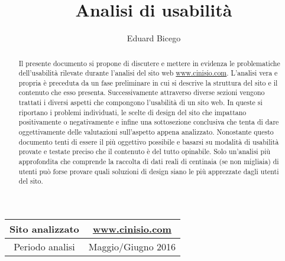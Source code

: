 \documentclass[a4paper,11pt]{article}
\begin{document}
\title{Analisi di usabilità}
\author{Eduard Bicego}
\date{}

\maketitle

%


\begin{table} [h]
		\centering
		\begin{tabular}{c|c}
			Sito analizzato & \href{http://www.cinisio.com/}{www.cinisio.com} \\
			\midrule
			Periodo analisi & Maggio/Giugno 2016 \\
		\end{tabular}
	
\end{table}


\begin{abstract}

	Il presente documento si propone di discutere e mettere in evidenza le problematiche dell'usabilità rilevate durante l'analisi del sito web \href{http://www.cinisio.com/}{www.cinisio.com}. L'analisi vera e propria è preceduta da un fase preliminare in cui si descrive la struttura del sito e il contenuto che esso presenta. Successivamente attraverso diverse sezioni vengono trattati i diversi aspetti che compongono l'usabilità di un sito web. In queste si riportano i problemi individuati, le scelte di design del sito che impattano positivamente o negativamente e infine una sottosezione conclusiva che tenta di dare oggettivamente delle valutazioni sull'aspetto appena analizzato. 
	Nonostante questo documento tenti di essere il più oggettivo possibile e basarsi su modalità di usabilità provate e testate preciso che il contenuto è del tutto opinabile. Solo un'analisi più approfondita che comprende la raccolta di dati reali di centinaia (se non migliaia) di utenti può forse provare quali soluzioni di design siano le più apprezzate dagli utenti del sito.

\end{abstract}
	


\newpage
	\tableofcontents
\newpage
	\listoffigures

\hypersetup{linkcolor=blue, urlcolor=blue}














\end{document}
